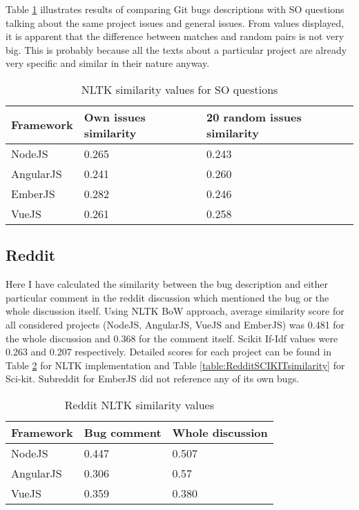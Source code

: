 Table \ref{table:StackOverflowNLTKsimilarity} illustrates results of comparing Git bugs descriptions with SO questions talking about the same project issues and general issues. From values displayed, it is apparent that the difference between matches and random pairs is not very big. This is probably because all the texts about a particular project are already very specific and similar in their nature anyway.

\begin{table}[H]
\centering
\begin{tabular}{ |p{3cm}||p{4.5cm}|p{5.5cm}|}
 \hline
\textbf{ Framework }& \textbf{Own issues similarity}& \textbf{20 random issues similarity}\\
 \hline
 NodeJS   & 0.265 & 0.243\\ \hline
 AngularJS & 0.241 & 0.260\\ \hline
 EmberJS & 0.282 & 0.246\\ \hline 
 VueJS &   0.261 & 0.258\\ \hline
\end{tabular}
\caption{NLTK similarity values for SO questions}
\label{table:StackOverflowNLTKsimilarity}
\end{table}

\subsection{Reddit}Here I have calculated the similarity between the bug description and either particular comment in the reddit discussion which mentioned the bug or the whole discussion itself. Using NLTK BoW approach, average similarity score for all considered projects (NodeJS, AngularJS, VueJS and EmberJS) was 0.481 for the whole discussion and 0.368 for the comment itself. Scikit If-Idf values were 0.263 and 0.207 respectively. Detailed scores for each project can be found in Table \ref{table:RedditNLTKsimilarity} for NLTK implementation and Table \ref{table:RedditSCIKITsimilarity} for Sci-kit. Subreddit for EmberJS did not reference any of its own bugs.

\begin{table}[H]
\centering
\begin{tabular}{ |p{3cm}||p{3cm}|p{4cm}|}
 \hline
\textbf{ Framework }& \textbf{Bug comment}& \textbf{Whole discussion}\\
 \hline
 NodeJS   & 0.447 & 0.507\\ \hline 
 AngularJS & 0.306 & 0.57 \\ \hline 
 VueJS &   0.359 & 0.380\\ \hline
\end{tabular}
\caption{Reddit NLTK similarity values}
\label{table:RedditNLTKsimilarity}
\end{table}

